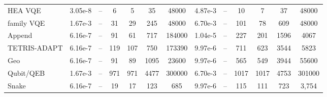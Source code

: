 \documentclass[
  reprint,
  amsmath,
  amssymb,
  aps,
  pra,
  nofootinbib,
  superscriptaddress,
  floatfix
]{revtex4-2}
\begin{document}
\begin{widetext}
\begin{minipage}{\textwidth}
\begin{center}
\begin{ruledtabular}
\begin{tabular}{p{}cccccc|cccccc}
\colrule
HEA VQE & 3.05e-8 & -- & 6 & 5 & 35 & 48000 & 4.87e-3 & -- & 10 & 7 & 37 & 48000\\
family VQE & 1.67e-3 & -- & 31 & 29 & 245 & 48000 & 6.70e-3 & -- & 101 & 78 & 609 & 48000\\
Append & 6.16e-7 & -- & 91 & 61 & 717 & 184000 & 1.04e-5 & -- & 227 & 201 & 1596 & 4067\\
TETRIS-ADAPT & 6.16e-7 & -- & 119 & 107 & 750 & 173390 & 9.97e-6 & -- & 711 & 623 & 3544 & 5823\\
Geo & 6.16e-7 & -- & 91 & 89 & 1095 & 23600 & 9.97e-6 & -- & 565 & 549 & 3944 & 55600\\
Qubit/QEB & 1.67e-3 & -- & 971 & 971 & 4477 & 300000 & 6.70e-3 & -- & 1017 & 1017 & 4753 & 301000\\
Snake & 6.16e-7 & -- & 19 & 17 & 123 & 685 & 9.97e-6 & -- & 115 & 111 & 723 & 3,754\\
\end{tabular}
\end{ruledtabular}
\end{center}
\end{minipage}
\par\addvspace{1.0ex}
\par\addvspace{1.0ex}
\end{widetext}
\fi
\end{document}
